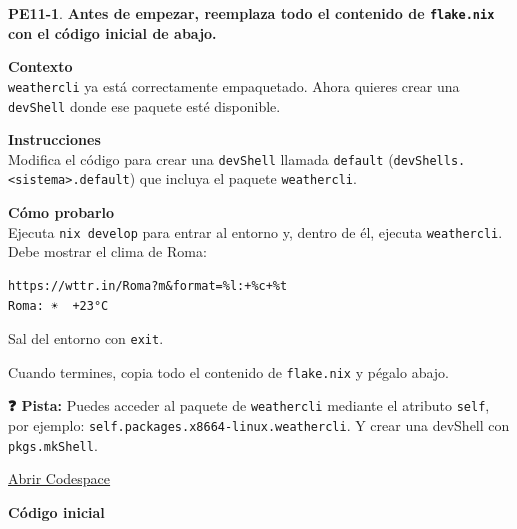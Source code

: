 \textbf{PE11-1}. \textbf{Antes de empezar, reemplaza todo el contenido de \texttt{flake.nix} con el código inicial de abajo.}

\textbf{Contexto}\\
\texttt{weathercli} ya está correctamente empaquetado. Ahora quieres crear una \texttt{devShell} donde ese paquete esté disponible.

\textbf{Instrucciones}\\
Modifica el código para crear una \texttt{devShell} llamada \texttt{default} (\texttt{devShells.\allowbreak{}<sistema>.\allowbreak{}default}) que incluya el paquete \texttt{weathercli}.

\textbf{Cómo probarlo}\\
Ejecuta \texttt{nix develop} para entrar al entorno y, dentro de él, ejecuta \texttt{weathercli}. Debe mostrar el clima de Roma:

\begin{bloquecodigo}
\begin{lstlisting}
https://wttr.in/Roma?m&format=%l:+%c+%t
Roma: ☀️  +23°C
\end{lstlisting}
\end{bloquecodigo}

Sal del entorno con \texttt{exit}.

Cuando termines, copia todo el contenido de \texttt{flake.nix} y pégalo abajo.

\textbf{❓ Pista:} Puedes acceder al paquete de \texttt{weathercli} mediante el atributo \texttt{self}, por ejemplo: \texttt{self.\allowbreak{}packages.\allowbreak{}x86\textunderscore{}\allowbreak{}64-\allowbreak{}linux.\allowbreak{}weathercli}. Y crear una devShell con \texttt{pkgs.mkShell}.

\href{https://codespaces.new/DanielRasho/Thesis-codespaces?quickstart=1&devcontainer_path=.devcontainer/nix/devcontainer.json}{\underline{Abrir Codespace}}

\textbf{Código inicial}

